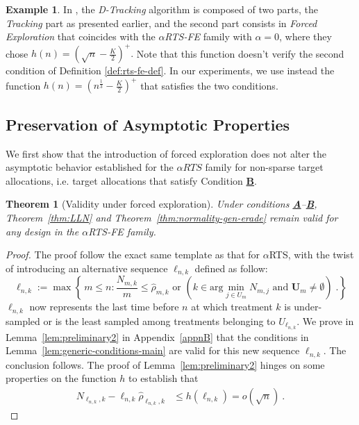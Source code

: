 \documentclass[11pt]{article}
\theoremstyle{plain}
\newtheorem{theorem}{Theorem}[section]
\theoremstyle{definition}
\newtheorem{example}{Example}[section]
\begin{document}
\begin{example}
	In \cite{garivier2016optimal}, the \textit{D-Tracking} algorithm is composed of two parts, the \textit{Tracking} part as presented earlier, and the second part consists in \textit{Forced Exploration} that coincides with the \textit{\(\alpha\)RTS-FE} family with \(\alpha=0\), where they chose \(h(n) = \left(\sqrt{n} - \frac{K}{2}\right)^+.\) Note that this function doesn't verify the second condition of Definition \ref{def:rts-fe-def}. In our experiments, we use instead the function \(h(n) = \left(n^{\frac{1}{3}} - \frac{K}{2}\right)^+\) that satisfies the two conditions.
\end{example}


\subsection{Preservation of Asymptotic Properties}

We first show that the introduction of forced exploration does not alter the asymptotic behavior established for the \(\alpha RTS\) family for non-sparse target allocations, i.e. target allocations that satisfy {Condition} \hyperlink{CB}{\textbf{B}}.

\begin{theorem}[Validity under forced exploration]\label{thm:forced} Under conditions \hyperlink{CA}{\textbf{A}}--\hyperlink{CB}{\textbf{B}}, Theorem~\ref{thm:LLN} and Theorem~\ref{thm:normality-gen-erade} %
	remain valid for any design in the \(\alpha\)RTS-FE family.
\end{theorem}

\begin{proof} The proof follow the exact same template as that for $\alpha$RTS, with the twist of introducing an alternative sequence $\ell_{n,k}$ defined as follow:
\begin{equation*}
	\ell_{n,k} := \max \left\{\, m \leq n : \frac{N_{m,k}}{m} \leq \hat{\rho}_{m,k} \text{ or } \left(k \in \text{arg}\!\min_{j \in U_m} N_{m,j}\text{ and } \mathbf{U}_m \neq \emptyset\right) \;.\right\}
\end{equation*}
$\ell_{n,k}$ now represents the last time before \(n\) at which treatment \(k\) is under-sampled or is the least sampled among treatments belonging to \(U_{\ell_{n,k}}\). We prove in Lemma~\ref{lem:preliminary2} in Appendix~\ref{appnB} that the conditions in Lemma~\ref{lem:generic-conditions-main} are valid for this new sequence $\ell_{n,k}$. The conclusion follows. The proof of Lemma~\ref{lem:preliminary2} hinges on some properties on the function \(h\) to establish that
\begin{align*}
	N_{\ell_{n,k},k} - \ell_{n,k} \hat{\rho}_{\ell_{n,k},k}
	&\leq h(\ell_{n,k})
	= o(\sqrt{n})
	\: .
\end{align*}
\end{proof}
\end{document}
